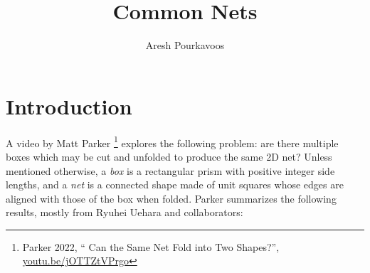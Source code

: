 \documentclass{article}
\begin{document}
\title{Common Nets}
\author{Aresh Pourkavoos}
\maketitle

\section{Introduction}

A video by Matt Parker
\footnote{
Parker 2022, `` Can the Same Net Fold into Two Shapes?'',
\href{https://youtu.be/jOTTZtVPrgo}{youtu.be/jOTTZtVPrgo}
}
explores the following problem:
are there multiple boxes which may be cut and unfolded
to produce the same 2D net?
Unless mentioned otherwise,
a \textit{box} is a rectangular prism with positive integer side lengths,
and a \textit{net} is a connected shape made of unit squares
whose edges are aligned with those of the box when folded.
Parker summarizes the following results,
mostly from Ryuhei Uehara and collaborators:
\end{document}
